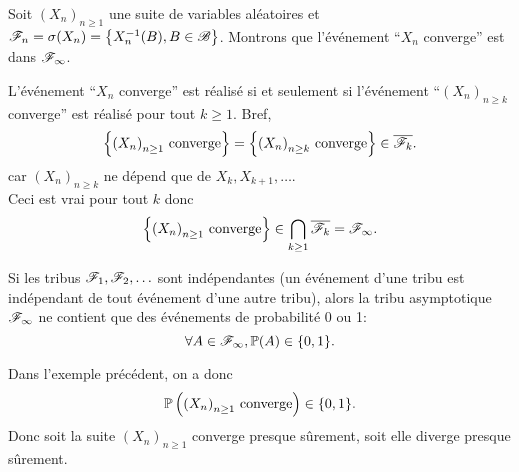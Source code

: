 \begin{example}
    Soit \({(X_n)}_{n\geq 1}\) une suite de variables aléatoires
    et \(\mathscr{F}_n = \sigma(X_n) = \left\{ X_n^{-1}(B), B\in\mathscr{B} \right\}\).
    Montrons que l'événement ``\(X_n\) converge'' est dans \(\mathscr{F}_\infty\).

    L'événement ``\(X_n\) converge'' est réalisé si et seulement
    si l'événement ``\({(X_n)}_{n\geq k}\) converge'' est réalisé
    pour tout \(k\geq 1\). Bref, 
    \begin{equation*}
        \left\{ {(X_n)}_{n\geq 1} \text{ converge} \right\} = \left\{ {(X_n)}_{n\geq k} \text{ converge}\right\} \in \overline{\mathscr{F}_k}.
    \end{equation*}
    car \({(X_n)}_{n\geq k}\) ne dépend que de \(X_k, X_{k+1},\ldots\).\\
    Ceci est vrai pour tout \(k\) donc
    \begin{equation*}
        \left\{ {(X_n)}_{n\geq 1} \text{ converge} \right\} \in
        \bigcap_{k\geq 1} \overline{\mathscr{F}_k} = \mathscr{F}_\infty.
    \end{equation*}
\end{example}

\begin{proposition}
    Si les tribus \(\mathscr{F}_1, \mathscr{F}_2,\ldots\) sont indépendantes
    (un événement d'une tribu est indépendant de tout événement d'une autre tribu),
    alors la tribu asymptotique \(\mathscr{F}_\infty\) ne contient que des événements
    de probabilité 0 ou 1:
    \begin{equation*}
        \forall A\in\mathscr{F}_\infty, \mathbb{P}(A) \in \{0,1\}.
    \end{equation*}
\end{proposition}

\begin{example}
    Dans l'exemple précédent, on a donc 
    \begin{equation*}
        \mathbb{P}\left( {(X_n)}_{n\geq 1} \text{ converge} \right) \in \{0,1\}.
    \end{equation*}
    Donc soit la suite \({(X_n)}_{n\geq 1}\) converge presque sûrement,
    soit elle diverge presque sûrement.
    
\end{example}